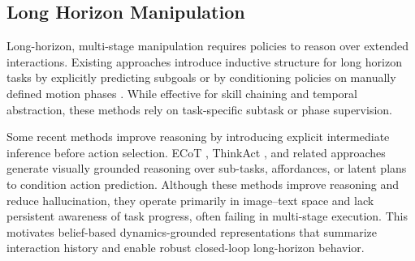 \documentclass[conference]{IEEEtran}
\begin{document}
\subsection{Long Horizon Manipulation}
Long-horizon, multi-stage manipulation requires policies to reason over extended interactions. Existing approaches introduce inductive structure for long horizon tasks by explicitly predicting subgoals \cite{yang2025lohovla} or by conditioning policies on manually defined motion phases \cite{fan2025long}. While effective for skill chaining and temporal abstraction, these methods rely on task-specific subtask or phase supervision.

Some recent methods improve reasoning by introducing explicit intermediate inference before action selection. ECoT \cite{zawalski2024robotic}, ThinkAct \cite{huang2507thinkact}, and related approaches \cite{zhao2025cot,li2025coa} generate visually grounded reasoning over sub-tasks, affordances, or latent plans to condition action prediction. Although these methods improve reasoning and reduce hallucination, they operate primarily in image–text space and lack persistent awareness of task progress, often failing in multi-stage execution. This motivates belief-based dynamics-grounded representations that summarize interaction history and enable robust closed-loop long-horizon behavior.
\end{document}
